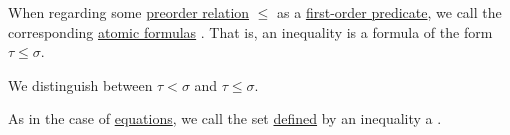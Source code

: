 \begin{definition}\label{def:inequality}\mimprovised
  When regarding some \hyperref[def:preordered_set]{preorder relation} \( \leq \) as a \hyperref[def:first_order_language/pred]{first-order predicate}, we call the corresponding \hyperref[def:first_order_syntax/atomic_formula]{atomic formulas} . That is, an inequality is a formula of the form \( \tau \leq \sigma \).

  We distinguish between  \( \tau < \sigma \) and  \( \tau \leq \sigma \).

  As in the case of \hyperref[def:first_order_equation]{equations}, we call the set \hyperref[def:first_order_definability]{defined} by an inequality a .
\end{definition}

